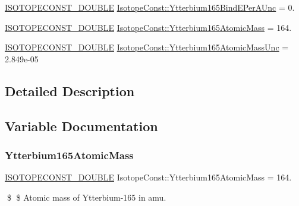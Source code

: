 \begin{DoxyCompactItemize}
\mbox{\hyperlink{group___isotope_const-_macros_ga8f45a7272ce02c0b4c65c44636ed719a}{I\+S\+O\+T\+O\+P\+E\+C\+O\+N\+S\+T\+\_\+\+D\+O\+U\+B\+LE}} \mbox{\hyperlink{group___isotope_const-_ytterbium-_yb165_ga21dd5dc5689ec15fd67810cf8f1dc78d}{Isotope\+Const\+::\+Ytterbium165\+Bind\+E\+Per\+A\+Unc}} = 0.
\item 
\mbox{\hyperlink{group___isotope_const-_macros_ga8f45a7272ce02c0b4c65c44636ed719a}{I\+S\+O\+T\+O\+P\+E\+C\+O\+N\+S\+T\+\_\+\+D\+O\+U\+B\+LE}} \mbox{\hyperlink{group___isotope_const-_ytterbium-_yb165_ga6b757cc4c8c174060054e1b2766fbde8}{Isotope\+Const\+::\+Ytterbium165\+Atomic\+Mass}} = 164.
\item 
\mbox{\hyperlink{group___isotope_const-_macros_ga8f45a7272ce02c0b4c65c44636ed719a}{I\+S\+O\+T\+O\+P\+E\+C\+O\+N\+S\+T\+\_\+\+D\+O\+U\+B\+LE}} \mbox{\hyperlink{group___isotope_const-_ytterbium-_yb165_ga488a1790068c8400a19837c02fb41631}{Isotope\+Const\+::\+Ytterbium165\+Atomic\+Mass\+Unc}} = 2.\+849e-\/05
\end{DoxyCompactItemize}


\subsection{Detailed Description}


\subsection{Variable Documentation}
\mbox{\label{group___isotope_const-_ytterbium-_yb165_ga6b757cc4c8c174060054e1b2766fbde8}} 
\subsubsection{\texorpdfstring{Ytterbium165\+Atomic\+Mass}{Ytterbium165AtomicMass}}
{\footnotesize\ttfamily \mbox{\hyperlink{group___isotope_const-_macros_ga8f45a7272ce02c0b4c65c44636ed719a}{I\+S\+O\+T\+O\+P\+E\+C\+O\+N\+S\+T\+\_\+\+D\+O\+U\+B\+LE}} Isotope\+Const\+::\+Ytterbium165\+Atomic\+Mass = 164.}

\$ \$ Atomic mass of Ytterbium-\/165 in amu. \mbox{\label{group___isotope_const-_ytterbium-_yb165_ga488a1790068c8400a19837c02fb41631}} 
